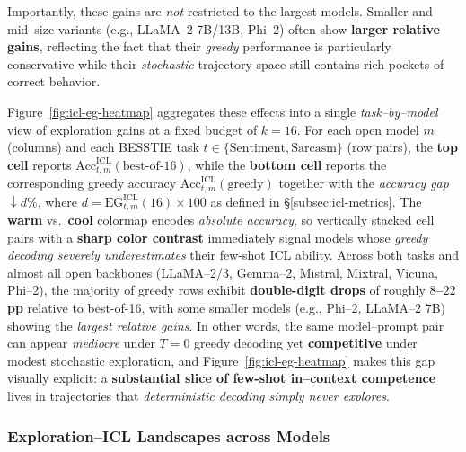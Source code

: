 Importantly, these gains are \emph{not} restricted to the largest
models. Smaller and mid--size variants (e.g., LLaMA--2 7B/13B, Phi--2)
often show \textbf{larger relative gains}, reflecting the fact that
their \emph{greedy} performance is particularly conservative while
their \emph{stochastic} trajectory space still contains rich pockets of
correct behavior.

\vspace{0.4em}
Figure~\ref{fig:icl-eg-heatmap} aggregates these effects into a single
\emph{task--by--model} view of exploration gains at a fixed budget of
$k{=}16$. For each open model $m$ (columns) and each BESSTIE task
$t \in \{\text{Sentiment},\text{Sarcasm}\}$ (row pairs), the
\textbf{top cell} reports
$\mathrm{Acc}^{\text{ICL}}_{t,m}(\text{best-of-}16)$, while the
\textbf{bottom cell} reports the corresponding greedy accuracy
$\mathrm{Acc}^{\text{ICL}}_{t,m}(\text{greedy})$ together with the
\emph{accuracy gap} $\downarrow d\%$, where
$d = \mathrm{EG}^{\text{ICL}}_{t,m}(16)\times 100$ as defined in
\S\ref{subsec:icl-metrics}. The
\textcolor{red!70!black}{\textbf{warm}} vs.\
\textcolor{blue!70!black}{\textbf{cool}} colormap encodes
\emph{absolute accuracy}, so vertically stacked cell pairs with a
\textbf{sharp color contrast} immediately signal models whose
\emph{greedy decoding severely underestimates} their few-shot ICL
ability. Across both tasks and almost all open backbones (LLaMA--2/3,
Gemma--2, Mistral, Mixtral, Vicuna, Phi--2), the majority of greedy rows
exhibit \textbf{double-digit drops} of roughly
\textbf{$8$--$22$\,pp} relative to best-of-16, with some smaller models
(e.g., Phi--2, LLaMA--2 7B) showing the \emph{largest relative gains}.
In other words, the same model--prompt pair can appear \emph{mediocre}
under $T{=}0$ greedy decoding yet \textbf{competitive} under modest
stochastic exploration, and Figure~\ref{fig:icl-eg-heatmap} makes this
gap visually explicit: a \textbf{substantial slice of few-shot
in--context competence} lives in trajectories that \emph{deterministic
decoding simply never explores}.














\subsubsection{Exploration--ICL Landscapes across Models}
\label{subsec:icl-landscapes}

